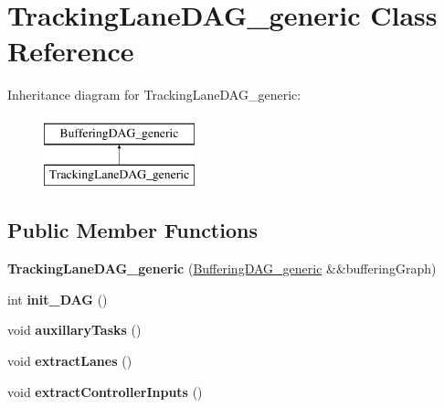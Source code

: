 \hypertarget{classTrackingLaneDAG__generic}{\section{Tracking\-Lane\-D\-A\-G\-\_\-generic Class Reference}
\label{classTrackingLaneDAG__generic}
}
Inheritance diagram for Tracking\-Lane\-D\-A\-G\-\_\-generic\-:\begin{figure}[H]
\begin{center}
\leavevmode
\includegraphics[height=2.000000cm]{classTrackingLaneDAG__generic}
\end{center}
\end{figure}
\subsection*{Public Member Functions}
\begin{DoxyCompactItemize}
\item 
\hypertarget{classTrackingLaneDAG__generic_adb64af801b50375a3f27aaf228d10a09}{{\bfseries Tracking\-Lane\-D\-A\-G\-\_\-generic} (\hyperlink{classBufferingDAG__generic}{Buffering\-D\-A\-G\-\_\-generic} \&\&buffering\-Graph)}\label{classTrackingLaneDAG__generic_adb64af801b50375a3f27aaf228d10a09}

\item 
\hypertarget{classTrackingLaneDAG__generic_af48c590b16df7c899d8462d73848b69d}{int {\bfseries init\-\_\-\-D\-A\-G} ()}\label{classTrackingLaneDAG__generic_af48c590b16df7c899d8462d73848b69d}

\item 
\hypertarget{classTrackingLaneDAG__generic_a52e21e76e2751170a3a43ce303e3523e}{void {\bfseries auxillary\-Tasks} ()}\label{classTrackingLaneDAG__generic_a52e21e76e2751170a3a43ce303e3523e}

\item 
\hypertarget{classTrackingLaneDAG__generic_a6ae6159ff33fc58e7ee158cabba7cb23}{void {\bfseries extract\-Lanes} ()}\label{classTrackingLaneDAG__generic_a6ae6159ff33fc58e7ee158cabba7cb23}

\item 
\hypertarget{classTrackingLaneDAG__generic_a9ca038fa0421160e4445d6936f986e89}{void {\bfseries extract\-Controller\-Inputs} ()}\label{classTrackingLaneDAG__generic_a9ca038fa0421160e4445d6936f986e89}

\end{DoxyCompactItemize}
